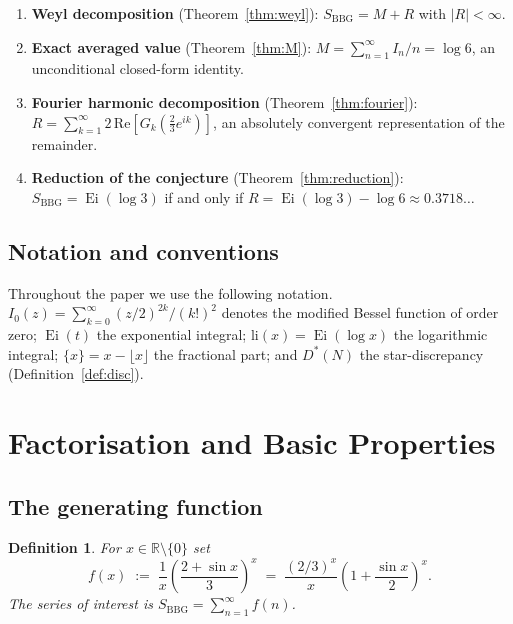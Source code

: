 \documentclass[12pt]{amsart}
\newtheorem{definition}[theorem]{Definition}
\DeclareMathOperator{\Ei}{Ei}
\newcommand{\li}{\mathrm{li}}
\newcommand{\R}{\mathbb{R}}
\begin{document}
\begin{enumerate}[label=(\arabic*)]
\item \textbf{Weyl decomposition} (Theorem~\ref{thm:weyl}):
  $S_{\mathrm{BBG}} = M + R$ with $|R|<\infty$.

\item \textbf{Exact averaged value} (Theorem~\ref{thm:M}):
  $M = \sum_{n=1}^{\infty} I_n/n = \log 6$,
  an unconditional closed-form identity.

\item \textbf{Fourier harmonic decomposition} (Theorem~\ref{thm:fourier}):
  $R = \sum_{k=1}^{\infty} 2\,\mathrm{Re}[G_k(\tfrac{2}{3}e^{ik})]$,
  an absolutely convergent representation of the remainder.

\item \textbf{Reduction of the conjecture}
  (Theorem~\ref{thm:reduction}):
  $S_{\mathrm{BBG}} = \Ei(\log 3)$
  if and only if
  $R = \Ei(\log 3)-\log 6\approx 0.3718\ldots$
\end{enumerate}

\subsection{Notation and conventions}

Throughout the paper we use the following notation.
$I_0(z)=\sum_{k=0}^{\infty}(z/2)^{2k}/(k!)^2$ denotes the modified
Bessel function of order zero; $\Ei(t)$ the exponential integral;
$\li(x)=\Ei(\log x)$ the logarithmic integral;
$\{x\}=x-\lfloor x\rfloor$ the fractional part; and
$D^{*}(N)$ the star-discrepancy (Definition~\ref{def:disc}).

\section{Factorisation and Basic Properties}

\subsection{The generating function}

\begin{definition}\label{def:f}
For $x\in\R\setminus\{0\}$ set
\[
  f(x) \;:=\; \frac{1}{x}\!\left(\frac{2+\sin x}{3}\right)^{\!x}
          \;=\; \frac{(2/3)^x}{x}
                \!\left(1+\frac{\sin x}{2}\right)^{\!x}.
\]
The series of interest is $S_{\mathrm{BBG}}=\sum_{n=1}^{\infty}f(n)$.
\end{definition}
\end{document}
